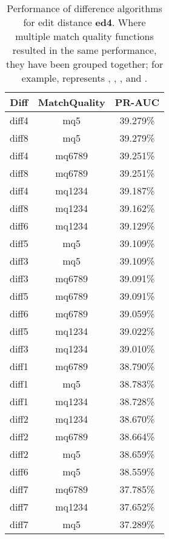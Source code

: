 \begin{table}[tbph]
\begin{center}
\begin{tabular}{|c|c||c|}
\hline
Diff & MatchQuality & PR-AUC  \\
\hline
\hline
diff4 & mq5 & 39.279\% \\
diff8 & mq5 & 39.279\% \\
diff4 & mq6789 & 39.251\% \\
diff8 & mq6789 & 39.251\% \\
diff4 & mq1234 & 39.187\% \\
diff8 & mq1234 & 39.162\% \\
diff6 & mq1234 & 39.129\% \\
diff5 & mq5 & 39.109\% \\
diff3 & mq5 & 39.109\% \\
diff3 & mq6789 & 39.091\% \\
diff5 & mq6789 & 39.091\% \\
diff6 & mq6789 & 39.059\% \\
diff5 & mq1234 & 39.022\% \\
diff3 & mq1234 & 39.010\% \\
diff1 & mq6789 & 38.790\% \\
diff1 & mq5 & 38.783\% \\
diff1 & mq1234 & 38.728\% \\
diff2 & mq1234 & 38.670\% \\
diff2 & mq6789 & 38.664\% \\
diff2 & mq5 & 38.659\% \\
diff6 & mq5 & 38.559\% \\
diff7 & mq6789 & 37.785\% \\
diff7 & mq1234 & 37.652\% \\
diff7 & mq5 & 37.289\% \\
\hline
\end{tabular}
\end{center}
\caption[Comparison of diff algorithms using edit distance \textbf{ed4}]{
  Performance of difference algorithms for
  edit distance \textbf{ed4}.  Where multiple match
  quality functions resulted in the same performance, they
  have been grouped together; for example,  represents
  , , , and .}
\label{tab:editlongbyed4}
\end{table}
